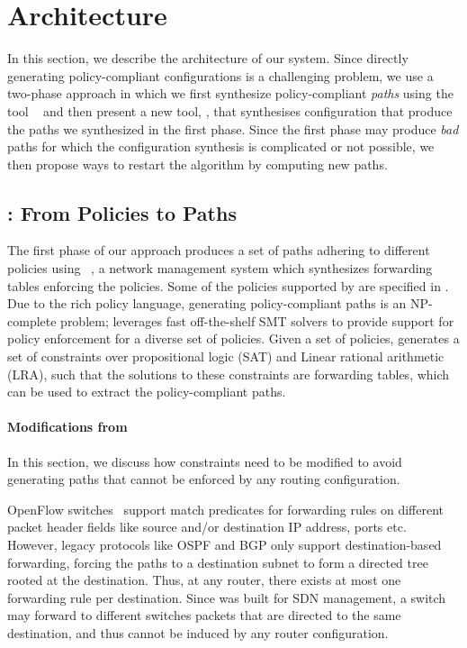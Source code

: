 \section{Architecture} \label{sec:architecture}
In this section, we describe the architecture of our system.
Since directly generating policy-compliant configurations
is a challenging problem, we use a two-phase approach in which
we first synthesize policy-compliant \emph{paths}
using the tool \genesis~\cite{genesis} and then present
a new tool, \name, that synthesises configuration that produce the
paths we synthesized in the first phase. 
Since the first phase may produce \emph{bad} paths for which the
configuration synthesis is complicated or not possible,
we then propose ways to restart the algorithm by computing new paths.

\subsection{\genesis: From Policies to Paths} \label{sec:genesis}
The first phase of our approach produces a set of paths adhering to
different policies using \genesis~\cite{genesis}, a network management
system which synthesizes forwarding tables enforcing the policies. 
Some of the policies supported by \genesis are specified in 
. 
Due to the rich policy language, generating policy-compliant paths is an NP-complete problem;
\genesis leverages fast off-the-shelf SMT solvers to provide
support for policy enforcement for a diverse set of policies.
Given a set of policies, \genesis generates a set of constraints 
over propositional logic (SAT) and Linear rational arithmetic (LRA),
such that the solutions to these constraints are forwarding
tables, which can be used to extract the 
policy-compliant paths.


\paragraph{Modifications from~\cite{genesis}}
In this section, we discuss how \genesis
constraints need to be modified to avoid generating paths that 
cannot be enforced by any routing configuration.

OpenFlow switches~\cite{openflow} support match predicates for
forwarding rules on different packet header fields like source
and/or destination IP address, ports etc. However, legacy protocols
like OSPF and BGP only support destination-based forwarding, 
forcing the paths to a destination subnet to 
form a directed tree rooted at the destination. 
Thus,
at any router, there exists at most one forwarding rule per destination. 
Since \genesis was built for
SDN management,  a switch may forward to different switches
packets that are directed to the same destination,
and thus cannot be induced by any router
configuration. 

